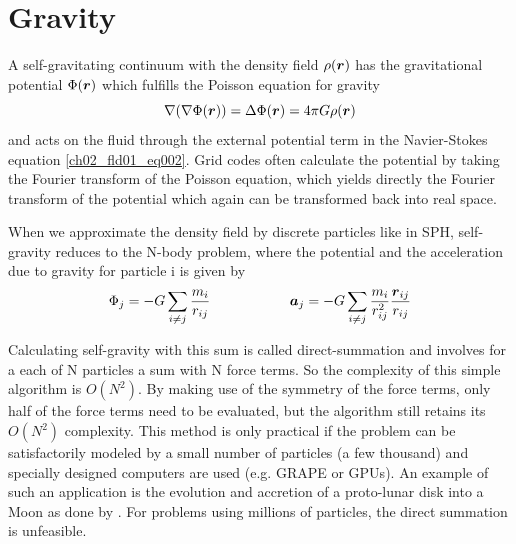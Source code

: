 \section{Gravity}
A self-gravitating continuum with the density field $\rho(\boldsymbol{r})$ has the gravitational potential $\Phi(\boldsymbol{r})$ which fulfills the Poisson equation for gravity
\begin{equation}
\label{ch02_sph01_eq038}
\nabla ( \nabla \Phi(\boldsymbol{r}) ) = \Delta \Phi(\boldsymbol{r}) = 4 \pi G \rho(\boldsymbol{r})
\end{equation}
and acts on the fluid through the external potential term in the Navier-Stokes equation \ref{ch02_fld01_eq002}. Grid codes often calculate the potential by taking the Fourier transform of the Poisson equation, which yields directly the Fourier transform of the potential which again can be transformed back into real space.

When we approximate the density field by discrete particles like in SPH, self-gravity reduces to the N-body problem, where the potential and the acceleration due to gravity for particle i is given by
\begin{equation}
\label{ch02_sph01_eq038}
\Phi_j = - G \sum_{i \ne j} \frac{m_i}{r_{ij}} \hspace{2.0cm} \boldsymbol{a}_j = - G \sum_{i \ne j} \frac{m_i}{r_{ij}^2} \frac{\boldsymbol{r}_{ij}}{r_{ij}} 
\end{equation}

Calculating self-gravity with this sum is called direct-summation and involves for a each of N particles a sum with N force terms. So the complexity of this simple algorithm is $O(N^2)$. By making use of the symmetry of the force terms, only half of the force terms need to be evaluated, but the algorithm still retains its $O(N^2)$ complexity. This method is only practical if the problem can be satisfactorily modeled by a small number of particles (a few thousand) and specially designed computers are used (e.g. GRAPE or GPUs). An example of such an application is the evolution and accretion of a proto-lunar disk into a Moon as done by \cite{Kokubo:2000p2195}. For problems using millions of particles, the direct summation is unfeasible.

